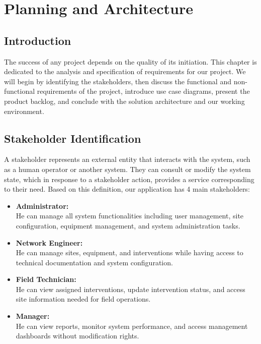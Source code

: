 \newpage

\lhead{\leftmark}
\chapter{Planning and Architecture}

\cfoot{\thepage}

\parindent=0.5in
\onehalfspacing
\section{Introduction}
The success of any project depends on the quality of its initiation. This chapter is dedicated to the analysis and specification of requirements for our project. We will begin by identifying the stakeholders, then discuss the functional and non-functional requirements of the project, introduce use case diagrams, present the product backlog, and conclude with the solution architecture and our working environment.

\section{Stakeholder Identification}
A stakeholder represents an external entity that interacts with the system, such as a human operator or another system. They can consult or modify the system state, which in response to a stakeholder action, provides a service corresponding to their need. Based on this definition, our application has 4 main stakeholders:

\vspace{0.5cm}

\begin{itemize}
\item \textbf{Administrator:} \\
He can manage all system functionalities including user management, site configuration, equipment management, and system administration tasks.

\vspace{0.5cm}

\item \textbf{Network Engineer:} \\
He can manage sites, equipment, and interventions while having access to technical documentation and system configuration.

\vspace{0.5cm}

\item \textbf{Field Technician:} \\
He can view assigned interventions, update intervention status, and access site information needed for field operations.

\vspace{0.5cm}

\item \textbf{Manager:} \\
He can view reports, monitor system performance, and access management dashboards without modification rights.
\end{itemize}

